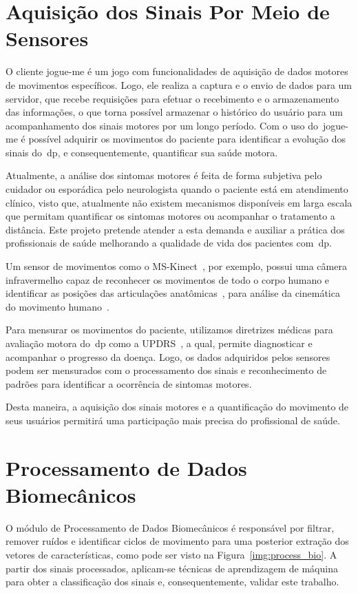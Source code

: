 \section{Aquisição dos Sinais Por Meio de Sensores}


O cliente \ac{jogue-me} é um jogo com funcionalidades de aquisição de dados motores de movimentos específicos. Logo, ele realiza a captura e o envio de dados para um servidor, que recebe requisições para efetuar o recebimento e o armazenamento das informações, o que torna possível armazenar o histórico do usuário para um acompanhamento dos sinais motores por um longo período. Com o uso do~\ac{jogue-me} é possível adquirir os movimentos do paciente para identificar a evolução dos sinais do~\ac{dp}, e consequentemente, quantificar sua saúde motora. 

Atualmente, a análise dos sintomas motores é feita de forma subjetiva pelo cuidador ou esporádica pelo neurologista quando o paciente está em atendimento clínico, visto que, atualmente não existem mecanismos disponíveis em larga escala que permitam quantificar os sintomas motores ou acompanhar o tratamento a distância. Este projeto pretende atender a esta demanda e auxiliar a prática dos profissionais de saúde melhorando a qualidade de vida dos pacientes com~\ac{dp}.

Um sensor de movimentos como o MS-Kinect~\cite{kinnect2013}, por exemplo, possui uma câmera infravermelho capaz de reconhecer os movimentos de todo o corpo humano e identificar as posições das articulações anatômicas~\cite{hamill1999bases}, para análise da cinemática do movimento humano~\cite{mcginnis2013biomechanics}. 

Para mensurar os movimentos do paciente, utilizamos diretrizes médicas para avaliação motora do~\ac{dp} como a UPDRS~\cite{updrs87}, a qual, permite diagnosticar e acompanhar o progresso da doença. Logo, os dados adquiridos pelos sensores podem ser mensurados com o processamento dos sinais e reconhecimento de padrões para identificar a ocorrência de sintomas motores. 

Desta maneira, a aquisição dos sinais motores e a quantificação do movimento de seus usuários permitirá uma participação mais precisa do profissional de saúde.


\section{Processamento de Dados Biomecânicos}\label{sec:processador_bio}
O módulo de Processamento de Dados Biomecânicos é responsável por filtrar, remover ruídos e identificar ciclos de movimento para uma posterior extração dos vetores de características, como pode ser visto na Figura~\ref{img:process_bio}. A partir dos sinais processados, aplicam-se técnicas de aprendizagem de máquina para obter a classificação dos sinais e, consequentemente, validar este trabalho.

